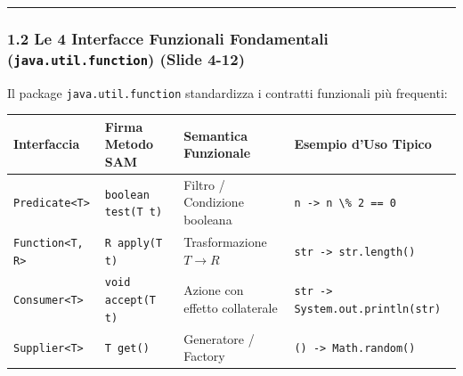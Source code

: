\documentclass[11pt,a4paper]{article}
\newcommand{\passthrough}[1]{#1}
\begin{document}
\begin{center}\rule{0.5\linewidth}{0.5pt}\end{center}

\subsubsection{\texorpdfstring{1.2 Le 4 Interfacce Funzionali
Fondamentali (\texttt{java.util.function}) (Slide
4-12)}{1.2 Le 4 Interfacce Funzionali Fondamentali (java.util.function) (Slide 4-12)}}\label{le-4-interfacce-funzionali-fondamentali-java.util.function-slide-4-12}

Il package \passthrough{\lstinline!java.util.function!} standardizza i
contratti funzionali più frequenti:

\begin{longtable}[]{@{}
  >{\raggedright\arraybackslash}p{}
  >{\raggedright\arraybackslash}p{}
  >{\raggedright\arraybackslash}p{}
  >{\raggedright\arraybackslash}p{}@{}}
\toprule\noalign{}
\begin{minipage}[b]{\linewidth}\raggedright
Interfaccia
\end{minipage} & \begin{minipage}[b]{\linewidth}\raggedright
Firma Metodo SAM
\end{minipage} & \begin{minipage}[b]{\linewidth}\raggedright
Semantica Funzionale
\end{minipage} & \begin{minipage}[b]{\linewidth}\raggedright
Esempio d'Uso Tipico
\end{minipage} \\
\midrule\noalign{}
\endhead
\bottomrule\noalign{}
\endlastfoot
\passthrough{\lstinline!Predicate<T>!} &
\passthrough{\lstinline!boolean test(T t)!} & Filtro / Condizione
booleana & \passthrough{\lstinline!n -> n \% 2 == 0!} \\
\passthrough{\lstinline!Function<T, R>!} &
\passthrough{\lstinline!R apply(T t)!} & Trasformazione \(T \to R\) &
\passthrough{\lstinline!str -> str.length()!} \\
\passthrough{\lstinline!Consumer<T>!} &
\passthrough{\lstinline!void accept(T t)!} & Azione con effetto
collaterale &
\passthrough{\lstinline!str -> System.out.println(str)!} \\
\passthrough{\lstinline!Supplier<T>!} &
\passthrough{\lstinline!T get()!} & Generatore / Factory &
\passthrough{\lstinline!() -> Math.random()!} \\
\end{longtable}
\end{document}
